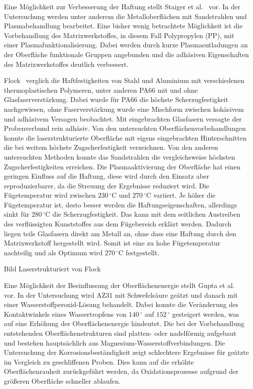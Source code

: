 Eine Möglichkeit zur Verbesserung der Haftung stellt Staiger et al.~\cite{Staiger.2014} vor.
In der Untersuchung werden unter anderem die Metalloberflächen mit Sandstrahlen und Plasmabehandlung bearbeitet.
Eine bisher wenig betrachtete Möglichkeit ist die Vorbehandlung des Matrixwerkstoffes, in diesem Fall Polypropylen (PP), mit einer Plasmafunktionalisierung.
Dabei werden durch kurze Plasmaentladungen an der Oberfläche funktionale Gruppen angebunden und die adhäsiven Eigenschaften des Matrixwerkstoffes deutlich verbessert.

Flock~\cite{Flock.b} verglich die Haftfestigkeiten von Stahl und Aluminium mit verschiedenen thermoplastischen Polymeren, unter anderen PA66 mit und ohne Glasfaserverstärkung.
Dabei wurde für PA66 die höchste Scherzugfestigkeit nachgewiesen, ohne Faserverstärkung wurde eine Mischform zwischen kohäsivem und adhäsivem Versagen beobachtet.
Mit eingebrachten Glasfasern versagte der Probenverbund rein adhäsiv.
Von den untersuchten Oberflächenvorbehandlungen konnte die laserstrukturierte Oberfläche mit eigens eingebrachten Hinterschnitten die bei weitem höchste Zugscherfestigkeit verzeichnen.
Von den anderen untersuchten Methoden konnte das Sandstrahlen die vergleichsweise höchsten Zugscherfestigkeiten erreichen.
Die Plasmaaktivierung der Oberfläche hat einen geringen Einfluss auf die Haftung, diese wird durch den Einsatz aber reproduzierbarer, da die Streuung der Ergebnisse reduziert wird.
Die Fügetemperatur wird zwischen $230 \, ^\circ \text{C}$ und $270 \, ^\circ \text{C}$ variiert.
Je höher die Fügetemperatur ist, desto besser werden die Haftungseigenschaften, allerdings sinkt für $280 \, ^\circ \text{C}$ die Scherzugfestigkeit.
Das kann mit dem seitlichen Austreiben des verflüssigten Kunststoffes aus dem Fügebereich erklärt werden.
Dadurch liegen teils Glasfasern direkt am Metall an, ohne dass eine Haftung durch den Matrixwerkstoff hergestellt wird.
Somit ist eine zu hohe Fügetemperatur nachteilig und als Optimum wird $270 \, ^\circ \text{C}$ festgestellt.

Bild Laserstrukturiert von Flock

Eine Möglichkeit der Beeinflussung der Oberflächenenergie stellt Gupta et al.~\cite{Gupta.2012} vor.
In der Untersuchung wird AZ31 mit Schwefelsäure geätzt und danach mit einer Wasserstoffperoxid-Lösung behandelt.
Dabei konnte die Veränderung des Kontaktwinkels eines Wassertropfens von $140\, ^\circ$ auf $152 \, ^\circ$ gesteigert werden, was auf eine Erhöhung der Oberflächenenergie hindeutet.
Die bei der Vorbehandlung entstehenden Oberflächenstrukturen sind platten- oder nadelförmig aufgebaut und bestehen hauptsächlich aus Magnesium-Wasserstoffverbindungen.
Die Untersuchung der Korrosionsbeständigkeit zeigt schlechtere Ergebnisse für geätzte im Vergleich zu geschliffenen Proben.
Dies kann auf die erhöhte Oberflächenrauheit zurückgeführt werden, da Oxidationsprozesse aufgrund der größeren Oberfläche schneller ablaufen.

